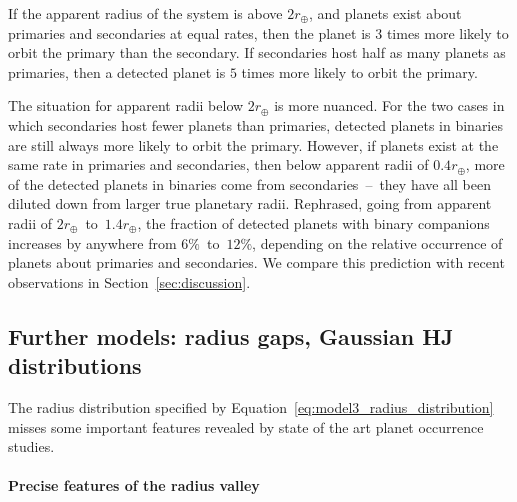 \documentclass[12pt,modern]{aastex61}
\renewcommand{\a}{_{\rm a}}
\begin{document}
If the apparent radius of the system is above $2r_\oplus$, and planets
exist about primaries and secondaries at equal rates, then the planet
is $3$ times more likely to orbit the primary than the
secondary.  If secondaries host half as many planets as primaries,
then a detected planet is $5$ times more likely to orbit the
primary.

The situation for apparent radii below $2r_\oplus$ is more nuanced.
For the two cases in which secondaries host fewer planets than
primaries, detected planets in binaries are still always more likely
to orbit the primary.  However, if planets exist at the same rate in
primaries and secondaries, then below apparent radii of $0.4r_\oplus$,
more of the detected planets in binaries come from secondaries~--~they
have all been diluted down from larger true planetary radii.
Rephrased, going from apparent radii of $2r_\oplus$~to~$1.4r_\oplus$,
the fraction of detected planets with binary companions increases by
anywhere from $6\%$~to~$12\%$, depending on the relative occurrence of
planets about primaries and secondaries.  We compare this prediction
with recent observations in Section~\ref{sec:discussion}.



\subsection{Further models: radius gaps, Gaussian HJ distributions}
\label{sec:further_models}

The radius distribution specified by
Equation~\ref{eq:model3_radius_distribution} misses some important
features revealed by state of the art planet occurrence studies.

\paragraph{Precise features of the radius valley}
\end{document}
